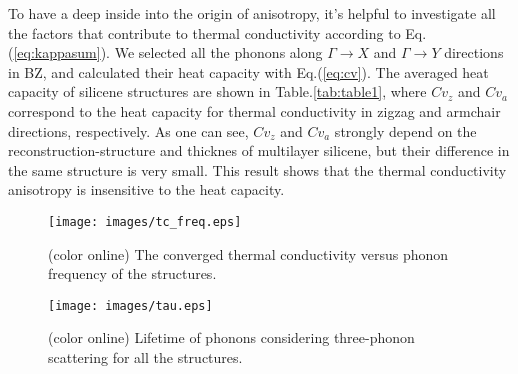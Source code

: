 \documentclass[aps,prb,twocolumn,showpacs,amsmath,amssymb]{revtex4-1}
\begin{document}
To have a deep inside into the origin of anisotropy, it's helpful to investigate all the factors that contribute to thermal conductivity according to Eq.(\ref{eq:kappasum}).
We selected all the phonons along  $\Gamma\rightarrow X$ and $\Gamma \rightarrow Y$ directions in BZ, and calculated their heat capacity with Eq.(\ref{eq:cv}). The averaged heat capacity of silicene structures are shown in Table.\ref{tab:table1}, where $Cv_z$ and $Cv_a$ correspond to the  heat capacity for thermal conductivity in  zigzag and armchair directions, respectively.  As one can see, $Cv_z$ and $Cv_a$  strongly depend on the reconstruction-structure and thicknes of multilayer silicene, but their difference in the same structure is very small. This result shows that the thermal conductivity anisotropy is insensitive to the heat capacity.

\begin{figure}[b]
  \texttt{[image: images/tc\_freq.eps]}
  \caption{\label{fig:tc_freq} (color online)  The converged thermal conductivity versus phonon frequency of the structures. }
\end{figure}

\begin{figure}[b]
  \texttt{[image: images/tau.eps]}
  \caption{\label{fig:tau} (color online) Lifetime of phonons considering three-phonon scattering for all the structures. }
\end{figure}
\end{document}
